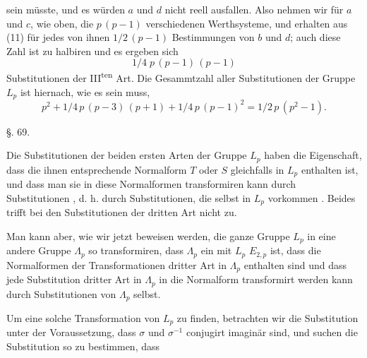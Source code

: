 sein müsste, und es würden $a$ und $d$ nicht reell ausfallen. Also
nehmen wir für $a$ und $c$, wie oben, die $p\,(p-1)$ verschiedenen
Werthsysteme, und erhalten aus (11) für jedes von ihnen
$1/2\,(p-1)$ Bestimmungen von $b$ und $d$; auch diese Zahl ist zu
halbiren und es ergeben sich
\[
1/4\;p\,(p-1)\,(p-1)
\]
Substitutionen der III\textsuperscript{ten} Art. Die Gesammtzahl aller Substitutionen
 der Gruppe $L_p$ ist hiernach, wie es sein muss,
\[
p^2 + 1/4\,p\,(p-3)\,(p+1) + 1/4\,p\,(p-1)^2 = 1/2\,p\,(p^2-1).
\]

\begin{center}
§. 69.

\end{center}

Die Substitutionen der beiden ersten Arten der Gruppe $L_p$
haben die Eigenschaft, dass die ihnen entsprechende Normalform
 $T$ oder $S$ gleichfalls in $L_p$ enthalten ist, und dass man sie
in diese Normalformen transformiren kann durch  Substitutionen
, d. h. durch Substitutionen, die selbst in $L_p$ vorkommen
. Beides trifft bei den Substitutionen der dritten Art
nicht zu.

Man kann aber, wie wir jetzt beweisen werden, die ganze
Gruppe $L_p$ in eine andere Gruppe $\Lambda_p$ so transformiren, dass $\Lambda_p$ ein
mit $L_p$  $E_{2,p}$ ist, dass die
Normalformen der Transformationen dritter Art in $\Lambda_p$ enthalten
sind und dass jede Substitution dritter Art in $\Lambda_p$ in die
Normalform transformirt werden kann durch Substitutionen von
$\Lambda_p$ selbst.

Um eine solche Transformation von $L_p$ zu finden, betrachten
wir die Substitution
unter der Voraussetzung, dass $\sigma$ und $\sigma^{-1}$ conjugirt imaginär
sind, und suchen die Substitution
so zu bestimmen, dass
